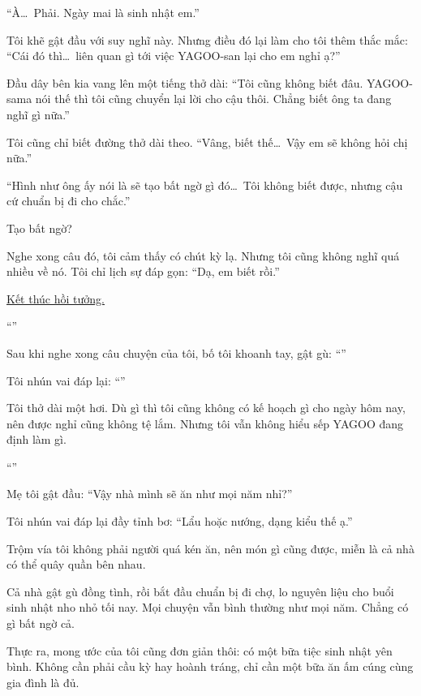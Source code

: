 \documentclass[../main.tex]{subfiles}
\begin{document}
``À\dots\ Phải. Ngày mai là sinh nhật em.''

Tôi khẽ gật đầu với suy nghĩ này. Nhưng điều đó lại làm cho tôi thêm thắc mắc: ``Cái đó thì\dots\ liên quan gì tới việc YAGOO-san lại cho em nghỉ ạ?''

Đầu dây bên kia vang lên một tiếng thở dài: ``Tôi cũng không biết đâu. YAGOO-sama nói thế thì tôi cũng chuyển lại lời cho cậu thôi. Chẳng biết ông ta đang nghĩ gì nữa.''

Tôi cũng chỉ biết đường thở dài theo. ``Vâng, biết thế\dots\ Vậy em sẽ không hỏi chị nữa.''

``Hình như ông ấy nói là sẽ tạo bất ngờ gì đó\dots\ Tôi không biết được, nhưng cậu cứ chuẩn bị đi cho chắc.''

Tạo bất ngờ?

Nghe xong câu đó, tôi cảm thấy có chút kỳ lạ. Nhưng tôi cũng không nghĩ quá nhiều về nó. Tôi chỉ lịch sự đáp gọn: ``Dạ, em biết rồi.''

\begin{center}
    \uline{Kết thúc hồi tưởng.}
\end{center}

``''

Sau khi nghe xong câu chuyện của tôi, bố tôi khoanh tay, gật gù: ``''

Tôi nhún vai đáp lại: ``''

Tôi thở dài một hơi. Dù gì thì tôi cũng không có kế hoạch gì cho ngày hôm nay, nên được nghỉ cũng không tệ lắm. Nhưng tôi vẫn không hiểu sếp YAGOO đang định làm gì.

``''

Mẹ tôi gật đầu: ``Vậy nhà mình sẽ ăn như mọi năm nhỉ?''

Tôi nhún vai đáp lại đầy tỉnh bơ: ``Lẩu hoặc nướng, dạng kiểu thế ạ.''

Trộm vía tôi không phải người quá kén ăn, nên món gì cũng được, miễn là cả nhà có thể quây quần bên nhau.

Cả nhà gật gù đồng tình, rồi bắt đầu chuẩn bị đi chợ, lo nguyên liệu cho buổi sinh nhật nho nhỏ tối nay. Mọi chuyện vẫn bình thường như mọi năm. Chẳng có gì bất ngờ cả.

Thực ra, mong ước của tôi cũng đơn giản thôi: có một bữa tiệc sinh nhật yên bình. Không cần phải cầu kỳ hay hoành tráng, chỉ cần một bữa ăn ấm cúng cùng gia đình là đủ.
\end{document}
